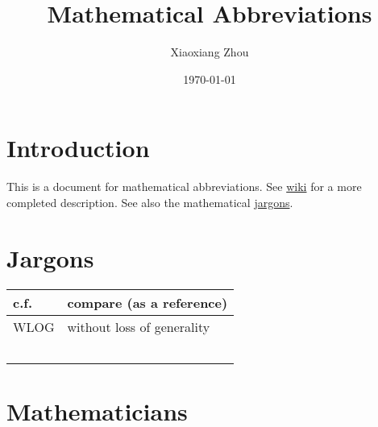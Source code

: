 \documentclass{amsart}
\numberwithin{equation}{section}
\theoremstyle{plain}
\numberwithin{equation}{section}
\theoremstyle{remark}
\begin{document}
\date{\today}

\title
{Mathematical Abbreviations
}
\author{Xiaoxiang Zhou}
\address{Institut für Mathematik\\Humboldt-Universität zu Berlin\\Unter den Linden 6\\10099 Berlin, Germany} 


\maketitle
\tableofcontents


\section{Introduction}
This is a document for mathematical abbreviations. See \href{https://en.wikipedia.org/wiki/List_of_mathematical_abbreviations}{wiki} for a more completed description. See also the mathematical \href{https://en.wikipedia.org/wiki/List_of_mathematical_jargon}{jargons}.

\section{Jargons}

\begin{longtable}{l|l}
\hline
c.f. & compare (as a reference) \\ \hline
WLOG & without loss of generality  \\ \hline
 & \\ \hline
 & \\ \hline
 & \\ \hline
 & \\ \hline
 & \\ \hline
\end{longtable}
\pagebreak
\section{Mathematicians}



\end{document}
